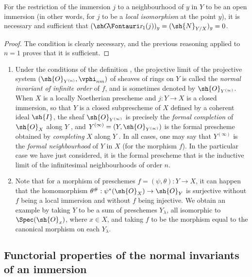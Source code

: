 \begin{corollary}[16.1.10]
\label{IV.16.1.10}
For the restriction of the immersion $j$ to a neighbourhood of $y$ in $Y$ to be an open immersion (in other words, for $j$ to be a \emph{local isomorphism} at the point $y$), it is necessary and sufficient that $(\shGr_1(j))_y = (\sh{N}_{Y/X})_y = 0$.
\end{corollary}

\begin{proof}
The condition is clearly necessary, and the previous reasoning applied to $n=1$ proves that it is sufficient.
\end{proof}

\begin{remark}[16.1.11]
\label{IV.16.1.11}
\medskip\noindent
\begin{enumerate}
  \item[(i)] Under the conditions of the definition , the projective limit of the projective system $(\sh{O}_{Y^{(n)}}, \vphi_{nm})$ of sheaves of rings on $Y$ is called the \emph{normal invariant of infinite order} of $f$, and is sometimes denoted by $\sh{O}_{Y^{(\infty)}}$.
  When $X$ is a locally Noetherian prescheme and $j:Y \to X$ is a closed immersion, so that $Y$ is a closed subprescheme of $X$ defined by a coherent ideal $\sh{I}$, the sheaf $\sh{O}_{Y^{(\infty)}}$ is precisely the \emph{formal completion} of $\sh{O}_X$ along $Y$ , and $Y^{(\infty)} = (Y, \sh{O}_{Y^{(\infty)}})$ is the formal prescheme obtained by \emph{completing} $X$ along $Y$ .
  In all cases, one may say that $Y^{(\infty)}$ is the \emph{formal neighbourhood} of $Y$ in $X$ (for the morphism $f$).
  In the particular case we have just considered, it is the formal prescheme that is the inductive limit of the infinitesimal neighbourhoods of order $n$.
  \item[(ii)] Note that for a morphism of preschemes $f=(\psi, \theta): Y \to X$, it can happen that the homomorphism $\theta^\#:\psi^*(\sh{O}_X) \to \sh{O}_Y$ is surjective without $f$ being a local 
  immersion and without $f$ being injective.
  We obtain an example by taking $Y$ to be a sum of preschemes $Y_\lambda$, all isomorphic to $\Spec(\sh{O}_x)$, where $x \in X$, and taking $f$ to be the morphism equal to the canonical morphism on each $Y_\lambda$.
\end{enumerate}
\end{remark}

\subsection{Functorial properties of the normal invariants of an immersion}
\label{IV.16.2}

